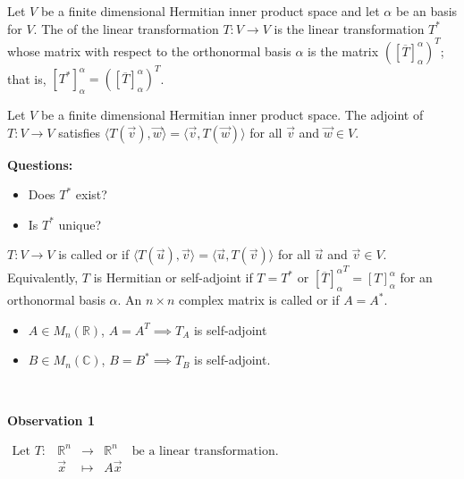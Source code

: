 \documentclass[11pt,fleqn]{book} %
\begin{document}
\setcounter{chapter}{5}
\setcounter{section}{3}
\setcounter{definitionT}{6}
\begin{definition}[Adjoint]
    Let $V$ be a finite dimensional Hermitian inner product space and let $\alpha$ be an  basis for $V$. The  of the linear transformation $T: V \to V$ is the linear transformation $T^*$ whose matrix with respect to the orthonormal basis $\alpha$ is the matrix $([\overline{T}]_\alpha^\alpha)^T$; that is, $[T^*]_\alpha^\alpha = ([\overline{T}]_\alpha^\alpha)^T$.
\end{definition}

\setcounter{dummy}{7}
\begin{proposition}
    Let $V$ be a finite dimensional Hermitian inner product space. The adjoint of $T: V \to V$ satisfies $\langle T(\vec{v}), \vec{w} \rangle = \langle \vec{v}, T(\vec{w}) \rangle$ for all $\vec{v}$ and $\vec{w} \in V$.
\end{proposition}

\textbf{Questions: }
\begin{itemize}
    \item Does $T^*$ exist?
    \item Is $T^*$ unique?
\end{itemize}

\setcounter{definitionT}{8}
\begin{definition}
    $T: V \to V$ is called  or  if $\langle T(\vec{u}), \vec{v} \rangle = \langle \vec{u}, T(\vec{v}) \rangle$ for all $\vec{u}$ and $\vec{v} \in V$. Equivalently, $T$ is Hermitian or self-adjoint if $T = T^*$ or ${[\overline{T}]_\alpha^\alpha}^T = [T]_\alpha^\alpha$ for an orthonormal basis $\alpha$. An $n \times n$ complex matrix is called  or  if $A = A^*$.
\end{definition}
\setcounter{section}{5}
\setcounter{chapter}{3}
\begin{itemize}
    \item $A \in M_n(\mathbb{R})$, $A = A^T \implies T_A$ is self-adjoint
    \item $B \in M_n(\mathbb{C})$, $B = B^* \implies T_B$ is self-adjoint.
\end{itemize}

{~~~}

\textbf{Observation 1}

$\begin{matrix} \text{Let }T: &\mathbb{R}^n &\to &\mathbb{R} ^n &\text{be a linear transformation. }\\ &\vec{x} &\mapsto &A\vec{x} \end{matrix}$
\end{document}
